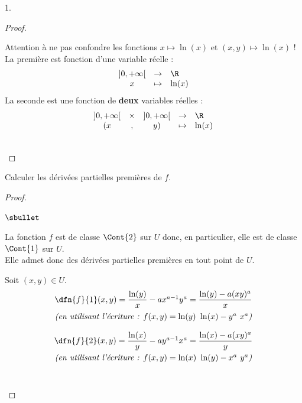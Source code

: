 \begin{noliste}{1.}
\begin{proof}
    \begin{remark}
      Attention à ne pas confondre les fonctions $x\mapsto \ln(x)$ et 
      $(x,y)\mapsto \ln(x)$ !\\
      La première est fonction d'une variable réelle : 
      \[
      \begin{array}{ccl}
        ]0,+\infty[ & \to & \R\\
        x & \mapsto & \ln(x)
      \end{array}
      \]
      La seconde est une fonction de {\bf deux} variables réelles :
      \[
      \begin{array}{ccccl}
        ]0,+\infty[ & \times &  ]0,+\infty[ & \to & \R\\
        (x &  , &  y) & \mapsto & \ln(x)
      \end{array}
      \]
    \end{remark}~\\[-1.4cm]
  \end{proof}
  
\item Calculer les dérivées partielles premières de $f$.
  
  \begin{proof}~
    \begin{noliste}{$\sbullet$}
    \item La fonction $f$ est de classe $\Cont{2}$ sur $U$ donc, en
      particulier, elle est de classe $\Cont{1}$ sur $U$.\\
      Elle admet donc des dérivées partielles premières en tout point
      de $U$.
    \item Soit $(x,y)\in U$.
      \[
      \begin{array}{c}
        \dfn{f}{1}(x,y) = 
        \dfrac{\ln(y)}{x}-ax^{a-1}y^a=\dfrac{\ln(y)-a(xy)^a}{x}
        \\[.3cm]
        \text{\it (en utilisant l'écriture : $f(x, y) = \ln(y) \ \ln(x) -
          y^a \ x^a$)} 
        \\[.4cm]
        \dfn{f}{2}(x,y) = 
        \dfrac{\ln(x)}{y}-ay^{a-1}x^a=\dfrac{\ln(x)-a(xy)^a}{y}
        \\[.3cm]
        \text{\it (en utilisant l'écriture : $f(x, y) = \ln(x) \ \ln(y) -
          x^a \ y^a$)} 
      \end{array}
      \]
      ~\\[-1.2cm]
    \end{noliste}
  \end{proof}
  

\end{noliste}
